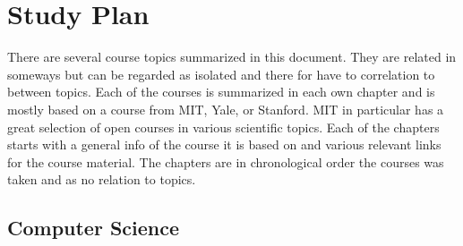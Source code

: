 \documentclass{book}
\author{Anton Augustsson}
\begin{document}
\maketitle
\newpage
\tableofcontents
\newpage



\chapter{Study Plan}
There are several course topics summarized in this document.
They are related in someways but can be regarded as isolated and there for have to correlation to between topics.
Each of the courses is summarized in each own chapter and is mostly based on a course from MIT, Yale, or Stanford.
MIT in particular has a great selection of open courses in various scientific topics. Each of the chapters starts
with a general info of the course it is based on and various relevant links for the course material.
The chapters are in chronological order the courses was taken and as no relation to topics.
\newpage

\section{Computer Science}
\resizebox{0.9\textwidth}{!}{} \newpage


\newcommand{\pathCS}{../../chapters/Computer-Science}

\newcommand{\pathECPP}{\pathCS/Embedded-C++}  \newpage
\newcommand{\pathCMAKE}{\pathCS/CMake}  \newpage
\newcommand{\pathGIT}{\pathCS/Git}  \newpage

 

\newpage


\end{document}
